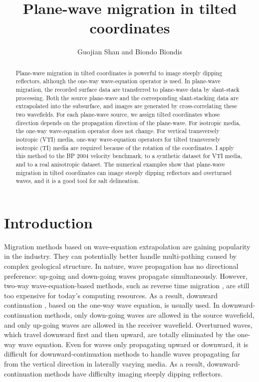 \title{Plane-wave migration in tilted coordinates}
\author{Guojian Shan and Biondo Biondis}

\maketitle

\begin{abstract}
Plane-wave migration in tilted coordinates is powerful to image steeply dipping reflectors, 
although the one-way wave-equation operator is used. In plane-wave migration, 
the recorded surface data are transferred to plane-wave data by slant-stack processing. 
Both the source plane-wave and the corresponding slant-stacking data
are extrapolated into the subsurface, and images are generated by cross-correlating these two
wavefields. For each plane-wave source, we assign tilted coordinates whose direction depends on
the propagation direction of the plane-wave. For isotropic media, the one-way wave-equation
operator does not change. For vertical transversely isotropic (VTI) media, 
one-way wave-equation operators for tilted transversely isotropic (TI) media are
required because of the rotation of the coordinates. I apply this method to the BP 2004 velocity benchmark,
 to a synthetic dataset for VTI media, and to a real anisotropic dataset. The numerical examples show
that plane-wave migration in tilted coordinates can image steeply dipping reflectors 
and overturned waves, and it is a good tool for salt delineation.
\end{abstract}

\section{Introduction}
Migration methods based on wave-equation extrapolation are gaining popularity in the 
industry. They can potentially better handle multi-pathing caused by complex geological 
structure. In nature, wave propagation has no directional preference: up-going and 
down-going waves propagate simultaneously. However, two-way wave-equation-based methods, 
such as reverse time migration \cite{SEG-1983-S10.1,GEO.48.11.15141524,SEG-2002-12841287}, are still too expensive
 for today's computing resources. As a result, downward continuation \cite{jon1985book}, 
based on the one-way wave equation, is usually used. In downward-continuation methods, 
only down-going waves are allowed in the source wavefield, and only up-going waves are 
allowed in the receiver wavefield. Overturned waves, which travel downward first and 
then upward, are totally eliminated by the one-way wave equation.  
Even for waves only propagating upward or downward, it is difficult for downward-continuation methods to handle waves propagating 
far from the vertical direction in laterally varying media. As a result, downward-continuation methods have 
difficulty imaging steeply dipping reflectors.


